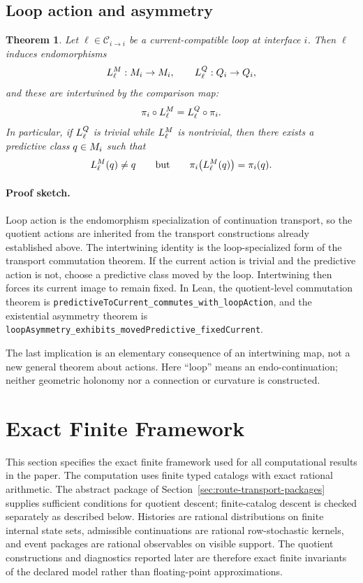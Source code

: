 \documentclass[11pt]{article}
\newtheorem{theorem}{Theorem}[section]
\theoremstyle{definition}
\begin{document}
\subsection{Loop action and asymmetry}\label{subsec:thm-loops}
\begin{theorem}\label{thm:loop-asymmetry}
Let $\ell\in\mathcal{C}_{i\to i}$ be a current-compatible loop at interface $i$. Then $\ell$ induces endomorphisms
\[
L^{M}_{\ell} : M_i \to M_i,
\qquad
L^{Q}_{\ell} : Q_i \to Q_i,
\]
and these are intertwined by the comparison map:
\[
\pi_i \circ L^{M}_{\ell}
=
L^{Q}_{\ell} \circ \pi_i.
\]
In particular, if $L^{Q}_{\ell}$ is trivial while $L^{M}_{\ell}$ is nontrivial, then there exists a predictive class $q\in M_i$ such that
\[
L^{M}_{\ell}(q)\neq q
\qquad\text{but}\qquad
\pi_i\bigl(L^{M}_{\ell}(q)\bigr)=\pi_i(q).
\]
\end{theorem}

\paragraph{Proof sketch.}
Loop action is the endomorphism specialization of continuation transport, so the quotient actions are inherited from the transport constructions already established above. The intertwining identity is the loop-specialized form of the transport commutation theorem. If the current action is trivial and the predictive action is not, choose a predictive class moved by the loop. Intertwining then forces its current image to remain fixed. In Lean, the quotient-level commutation theorem is \nolinkurl{predictiveToCurrent_commutes_with_loopAction}, and the existential asymmetry theorem is \nolinkurl{loopAsymmetry_exhibits_movedPredictive_fixedCurrent}.

The last implication is an elementary consequence of an intertwining map, not a new general theorem about actions. Here ``loop'' means an endo-continuation; neither geometric holonomy nor a connection or curvature is constructed.

\section{Exact Finite Framework}\label{sec:exact-finite-framework}
This section specifies the exact finite framework used for all computational results in the paper. The computation uses finite typed catalogs with exact rational arithmetic. The abstract package of Section~\ref{sec:route-transport-packages} supplies sufficient conditions for quotient descent; finite-catalog descent is checked separately as described below. Histories are rational distributions on finite internal state sets, admissible continuations are rational row-stochastic kernels, and event packages are rational observables on visible support. The quotient constructions and diagnostics reported later are therefore exact finite invariants of the declared model rather than floating-point approximations.
\end{document}
